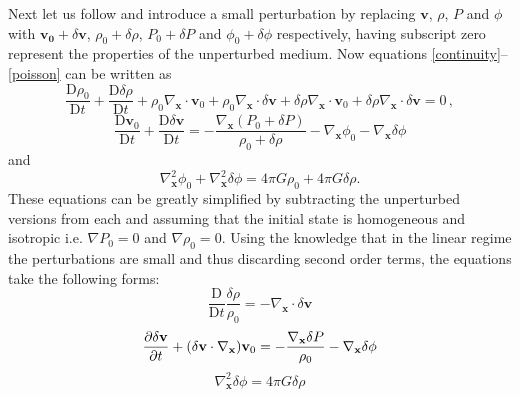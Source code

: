 \documentclass[english, oneside]{HYgradu}
\begin{document}
Next let us follow \citet{longair2008galaxy} and introduce a small perturbation by replacing $\mathbf{v}$, $\rho$, $P$ and $\phi$ with $\mathbf{v_0} + \delta\mathbf{v}$, $\rho_0 + \delta\rho$, $P_0 + \delta P$ and $\phi_0 + \delta \phi$ respectively, having subscript zero represent the properties of the unperturbed medium. Now equations \ref{continuity}--\ref{poisson} can be written as
\begin{equation}
\frac{\textrm{D}\rho_0}{\textrm{D}t} + \frac{\textrm{D}\delta\rho}{\textrm{D}t} + \rho_0 \nabla_\mathbf{x}\cdot{\mathbf{v}_0} + \rho_0 \nabla_\mathbf{x} \cdot\delta{\mathbf{v}} + \delta \rho \nabla_\mathbf{x} \cdot{\mathbf{v}}_0 + \delta\rho \nabla_\mathbf{x} \cdot\delta{\mathbf{v}}  = 0 \,,
\end{equation}
\begin{equation}
\frac{\textrm{D} \mathbf{v}_0}{\textrm{D}t} + \frac{\textrm{D} \delta\mathbf{v}}{\textrm{D}t}= - \frac{\nabla_\mathbf{x} (P_0 + \delta P)}{\rho_0 + \delta \rho} - \nabla_\mathbf{x}\phi_0 - \nabla_\mathbf{x}\delta\phi
\end{equation}
and
\begin{equation}
\nabla_\mathbf{x}^2\phi_0 + \nabla_\mathbf{x}^2\delta\phi = 4\pi G\rho_0 + 4\pi G\delta\rho.
\end{equation}
These equations can be greatly simplified by subtracting the unperturbed versions from each and assuming that the initial state is homogeneous and isotropic i.e. $\nabla P_0=0$ and $\nabla \rho_0 = 0$. Using the knowledge that in the linear regime the perturbations are small and thus discarding second order terms, the equations take the following forms:
\begin{equation}
\frac{\textrm{D}}{\textrm{D}t} \frac{\delta \rho}{\rho_0} = -\nabla_\mathbf{x} \cdot \delta \mathbf{v}
\end{equation}
\begin{equation}
\pdv{\delta \mathbf{v}}{t} + (\delta \mathbf{v} \cdot \nabla_\mathbf{x}) \mathbf{v}_0 = - \frac{\nabla_\mathbf{x} \delta P}{\rho_0} - \nabla_\mathbf{x} \delta \phi
\end{equation}
\begin{equation}
\nabla_\mathbf{x}^2\delta \phi = 4 \pi G \delta \rho
\end{equation}
\end{document}
